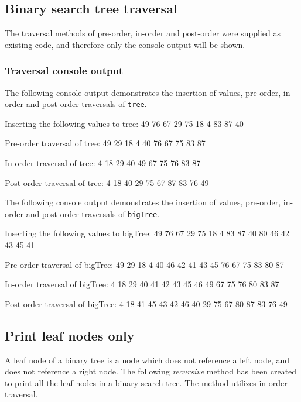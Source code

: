 \newpage
\subsection{Binary search tree traversal}

The traversal methods of pre-order, in-order and post-order were supplied as existing code, and therefore only the console output will be shown.

\subsubsection{Traversal console output}

The following console output demonstrates the insertion of values, pre-order, in-order and post-order traversals of \texttt{tree}.
\\
\begin{consolecode}
Inserting the following values to tree: 
49 76 67 29 75 18 4 83 87 40 

Pre-order traversal of tree:
49 29 18 4 40 76 67 75 83 87 

In-order traversal of tree:
4 18 29 40 49 67 75 76 83 87 

Post-order traversal of tree:
4 18 40 29 75 67 87 83 76 49 
\end{consolecode}

\noindent
The following console output demonstrates the insertion of values, pre-order, in-order and post-order traversals of \texttt{bigTree}.
\\
\begin{consolecode}
Inserting the following values to bigTree: 
49 76 67 29 75 18 4 83 87 40 80 46 42 43 45 41 

Pre-order traversal of bigTree:
49 29 18 4 40 46 42 41 43 45 76 67 75 83 80 87 

In-order traversal of bigTree:
4 18 29 40 41 42 43 45 46 49 67 75 76 80 83 87 

Post-order traversal of bigTree:
4 18 41 45 43 42 46 40 29 75 67 80 87 83 76 49
\end{consolecode}

\newpage
\subsection{Print leaf nodes only}

A leaf node of a binary tree is a node which does not reference a left node, and does not reference a right node. The following \emph{recursive} method has been created to print all the leaf nodes in a binary search tree. The method utilizes in-order traversal.

